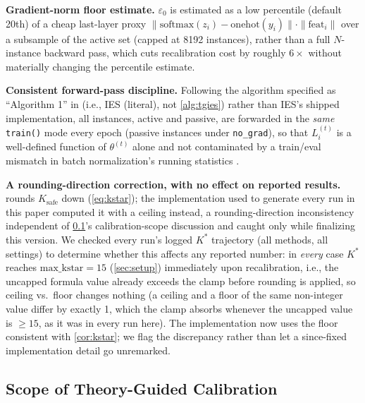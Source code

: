 \documentclass{article}
\theoremstyle{plain}
\theoremstyle{definition}
\theoremstyle{remark}
\begin{document}
\textbf{Gradient-norm floor estimate.} $\varepsilon_0$ is estimated as a low percentile (default 20th) of a cheap last-layer proxy $\|\mathrm{softmax}(z_i)-\mathrm{onehot}(y_i)\|\cdot\|\mathrm{feat}_i\|$ over a subsample of the active set (capped at 8192 instances), rather than a full $N$-instance backward pass, which cuts recalibration cost by roughly $6\times$ without materially changing the percentile estimate.

\textbf{Consistent forward-pass discipline.} Following the algorithm specified as ``Algorithm 1'' in \citet{yuan2025instance} (i.e., IES (literal), not \cref{alg:tgies}) rather than IES's shipped implementation, all instances, active and passive, are forwarded in the \emph{same} \texttt{train()} mode every epoch (passive instances under \texttt{no\_grad}), so that $L_i^{(t)}$ is a well-defined function of $\theta^{(t)}$ alone and not contaminated by a train/eval mismatch in batch normalization's running statistics \citep{ioffe2015batch}.

\textbf{A rounding-direction correction, with no effect on reported results.}  rounds $K_{\mathrm{safe}}$ down (\cref{eq:kstar}); the implementation used to generate every run in this paper computed it with a ceiling instead, a rounding-direction inconsistency independent of \cref{sec:selfcalib-scope}'s calibration-scope discussion and caught only while finalizing this version. We checked every run's logged $K^*$ trajectory (all methods, all settings) to determine whether this affects any reported number: in \emph{every} case $K^*$ reaches $\mathrm{max\_kstar}=15$ (\cref{sec:setup}) immediately upon recalibration, i.e., the uncapped formula value already exceeds the clamp before rounding is applied, so ceiling vs.\ floor changes nothing (a ceiling and a floor of the same non-integer value differ by exactly 1, which the clamp absorbs whenever the uncapped value is $\ge 15$, as it was in every run here). The implementation now uses the floor consistent with \cref{cor:kstar}; we flag the discrepancy rather than let a since-fixed implementation detail go unremarked.

\subsection{Scope of Theory-Guided Calibration}
\label{sec:selfcalib-scope}
\end{document}
